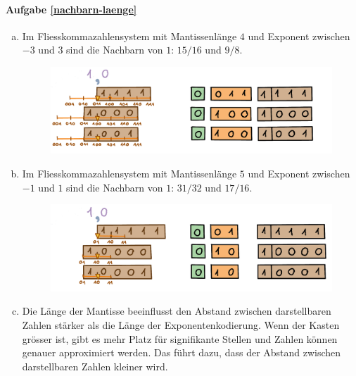 \paragraph{Aufgabe \ref{nachbarn-laenge}}
\begin{enumerate}[(a)]
\item Im Fliesskommazahlensystem mit Mantissenlänge \(4\) und Exponent zwischen \(-3\) und \(3\) sind die Nachbarn von \(1\): \(15/16\) und \(9/8\).
\begin{figure}[H]
\centering
\includegraphics[width=\linewidth]{Pictures/Nachbarn1-4-3-Loesung.png}
\end{figure}

\item Im Fliesskommazahlensystem mit Mantissenlänge \(5\) und Exponent zwischen \(-1\) und \(1\) sind die Nachbarn von \(1\): \(31/32\) und \(17/16\).
\begin{figure}[H]
\centering
\includegraphics[width=\linewidth]{Pictures/Nachbarn1-5-2-Loesung.png}
\end{figure}

\item Die Länge der Mantisse beeinflusst den Abstand zwischen darstellbaren Zahlen stärker als die Länge der Exponentenkodierung. Wenn der Kasten grösser ist, gibt es mehr Platz für signifikante Stellen und Zahlen können genauer approximiert werden. Das führt dazu, dass der Abstand zwischen darstellbaren Zahlen kleiner wird.
\end{enumerate}


